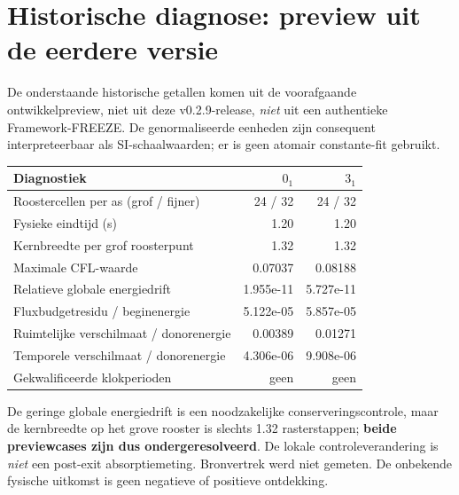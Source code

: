 \documentclass[10pt,a4paper]{article}
\begin{document}
\section{Historische diagnose: preview uit de eerdere versie}
De onderstaande historische getallen komen uit de voorafgaande ontwikkelpreview, niet uit deze v0.2.9-release, \emph{niet} uit een authentieke Framework-FREEZE. De genormaliseerde eenheden zijn consequent interpreteerbaar als SI-schaalwaarden; er is geen atomair constante-fit gebruikt.
\begin{center}\begin{tabular}{lrr}\toprule
Diagnostiek & $0_1$ & $3_1$\\\midrule
Roostercellen per as (grof / fijner) & 24 / 32 & 24 / 32\\
Fysieke eindtijd (s) & 1.20 & 1.20\\
Kernbreedte per grof roosterpunt & 1.32 & 1.32\\
Maximale CFL-waarde & 0.07037 & 0.08188\\
Relatieve globale energiedrift & 1.955e-11 & 5.727e-11\\
Fluxbudgetresidu / beginenergie & 5.122e-05 & 5.857e-05\\
Ruimtelijke verschilmaat / donorenergie & 0.00389 & 0.01271\\
Temporele verschilmaat / donorenergie & 4.306e-06 & 9.908e-06\\
Gekwalificeerde klokperioden & geen & geen\\\bottomrule
\end{tabular}\end{center}
De geringe globale energiedrift is een noodzakelijke conserveringscontrole, maar de kernbreedte op het grove rooster is slechts 1.32 rasterstappen; \textbf{beide previewcases zijn dus ondergeresolveerd}. De lokale controleverandering is \emph{niet} een post-exit absorptiemeting. Bronvertrek werd niet gemeten. De onbekende fysische uitkomst is geen negatieve of positieve ontdekking.
\end{document}
